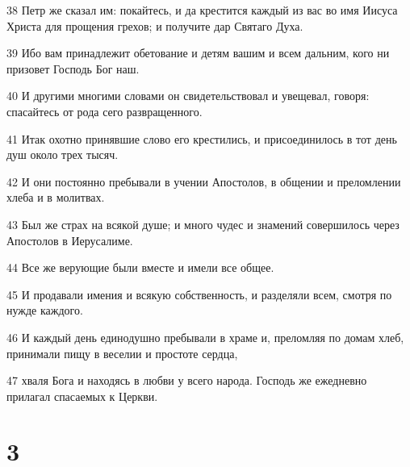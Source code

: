 \par 38 Петр же сказал им: покайтесь, и да крестится каждый из вас во имя Иисуса Христа для прощения грехов; и получите дар Святаго Духа.
\par 39 Ибо вам принадлежит обетование и детям вашим и всем дальним, кого ни призовет Господь Бог наш.
\par 40 И другими многими словами он свидетельствовал и увещевал, говоря: спасайтесь от рода сего развращенного.
\par 41 Итак охотно принявшие слово его крестились, и присоединилось в тот день душ около трех тысяч.
\par 42 И они постоянно пребывали в учении Апостолов, в общении и преломлении хлеба и в молитвах.
\par 43 Был же страх на всякой душе; и много чудес и знамений совершилось через Апостолов в Иерусалиме.
\par 44 Все же верующие были вместе и имели все общее.
\par 45 И продавали имения и всякую собственность, и разделяли всем, смотря по нужде каждого.
\par 46 И каждый день единодушно пребывали в храме и, преломляя по домам хлеб, принимали пищу в веселии и простоте сердца,
\par 47 хваля Бога и находясь в любви у всего народа. Господь же ежедневно прилагал спасаемых к Церкви.

\chapter{3}


